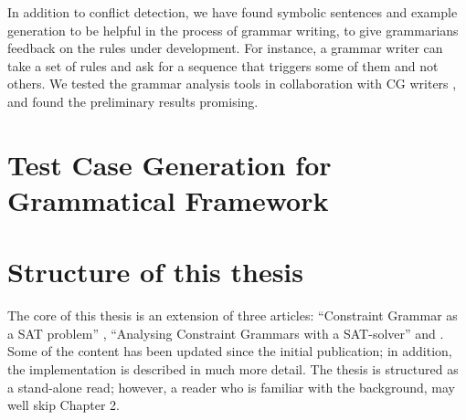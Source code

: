 In addition to conflict detection, we have found symbolic sentences and example generation to be helpful in the process of grammar writing, 
to give grammarians feedback on the rules under development.
For instance, a grammar writer can take a set of rules and ask for a sequence that triggers some of them and not others.
We tested the grammar analysis tools in collaboration with CG writers \cite{listenmaa_et_al2017}, and found the preliminary results promising.


\section{Test Case Generation for Grammatical Framework}








\section{Structure of this thesis}

The core of this thesis is an extension of three articles: ``Constraint Grammar as a SAT problem'' \cite{listenmaa_claessen2015}, ``Analysing Constraint Grammars with a SAT-solver'' \cite{listenmaa_claessen2016}
and . Some of the content has been updated since the initial publication; in addition, the implementation is described in much more detail. The thesis is structured as a stand-alone read; however, a reader who is familiar with the background, may well skip Chapter 2.

